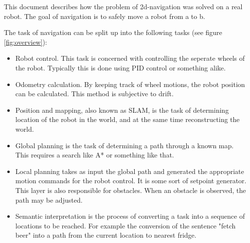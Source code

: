 \documentclass[a4paper]{article}
\begin{document}
This document describes how the problem of 2d-navigation was solved on a real robot.
The goal of navigation is to safely move a robot from a to b.

The task of navigation can be split up into the following tasks (see figure \ref{fig:overview}):

\begin{itemize}
  \item Robot control. This task is concerned with controlling the seperate wheels of the robot.
  Typically this is done using PID control or something alike.
  \item Odometry calculation. By keeping track of wheel motions, the robot position can be
calculated. This method is subjective to drift.
  \item Position and mapping, also known as SLAM, is the task of determining location of the robot in 
  the world, and at the same time reconstructing the world.
  \item Global planning is the task of determining a path through a known map. This requires a search
  like A* or something like that.
  \item Local planning takes as input the global path and generated the appropriate motion commands for
  the robot control. It is some sort of setpoint generator. This layer is also responsible for obstacles.
  When an obstacle is observed, the path may be adjusted.
  \item Semantic interpretation is the process of converting a task into a sequence of locations to be
  reached. For example the conversion of the sentence "fetch beer" into a path from the current location
  to nearest fridge.
\end{itemize}
\end{document}
